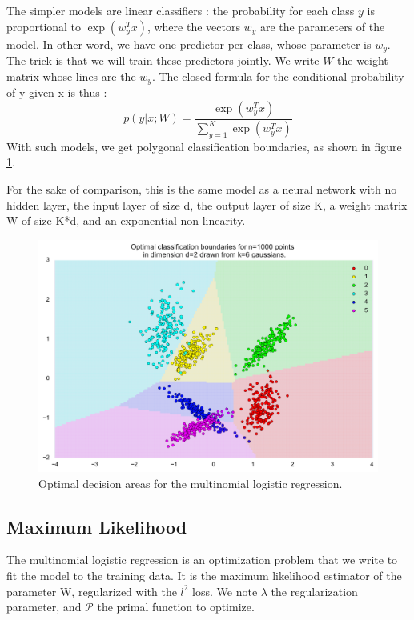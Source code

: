 \documentclass{article}
\begin{document}
The simpler models are linear classifiers : the probability for each class $y$ is proportional to $\exp(w_y^Tx)$, where the vectors $w_y$ are the parameters of the model.
In other word, we have one predictor per class, whose parameter is $w_y$.
The trick is that we will train these predictors jointly. 
We write $W$ the weight matrix whose lines are the $w_y$.
The closed formula for the conditional probability of y given x is thus :
\begin{equation}
	p(y|x;W) = \frac{\exp(w_y^Tx)}{\sum_{y=1}^K \exp(w_y^Tx)}
\end{equation}
With such models, we get polygonal classification boundaries, as shown in figure \ref{linear classification}.

For the sake of comparison, this is the same model as a neural network with no hidden layer, the input layer of size d, the output layer of size K, a weight matrix W of size K*d, and an exponential non-linearity.

\begin{figure}[ht]
	\label{linear classification}
	\includegraphics[width=\textwidth]{images/linear_classification.pdf}
	\caption{Optimal decision areas for the multinomial logistic regression.}
\end{figure}


 
 \subsection{Maximum Likelihood}
 
 The multinomial logistic regression is an optimization problem that we write to fit the model to the training data.
 It is the maximum likelihood estimator of the parameter W, regularized with the $l^2$ loss.
 We note $\lambda$ the regularization parameter, and $\mathscr{P}$ the primal function to optimize. 
 
\end{document}
